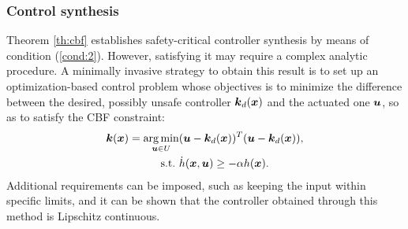 \subsubsection{Control synthesis}
Theorem \ref{th:cbf} establishes safety-critical controller 
synthesis by means of condition (\ref{cond:2}). However, satisfying  it may require a complex analytic procedure. A minimally invasive strategy to obtain this result is to set up an optimization-based control problem whose objectives is to minimize the difference between the desired, possibly unsafe controller $\boldsymbol{k}_d(\boldsymbol{x})$ and the actuated one $\boldsymbol{u}$, so as to satisfy the CBF constraint:
\begin{equation}
\begin{aligned}
\boldsymbol{k}(\boldsymbol{x})=\underset{\boldsymbol{u}\in U}{\arg\min}  &(\boldsymbol{u}-\boldsymbol{k}_d(\boldsymbol{x}))^T(\boldsymbol{u}-\boldsymbol{k}_d(\boldsymbol{x})), \\ 
\mathrm{s.t.}\,\, &\dot{h}(\boldsymbol{x},\boldsymbol{u})\geq -\alpha h(\boldsymbol{x}).
\end{aligned}
\end{equation}
Additional requirements can be imposed, such as keeping the input within specific limits, and it can be shown that the controller obtained through this method is Lipschitz continuous.
